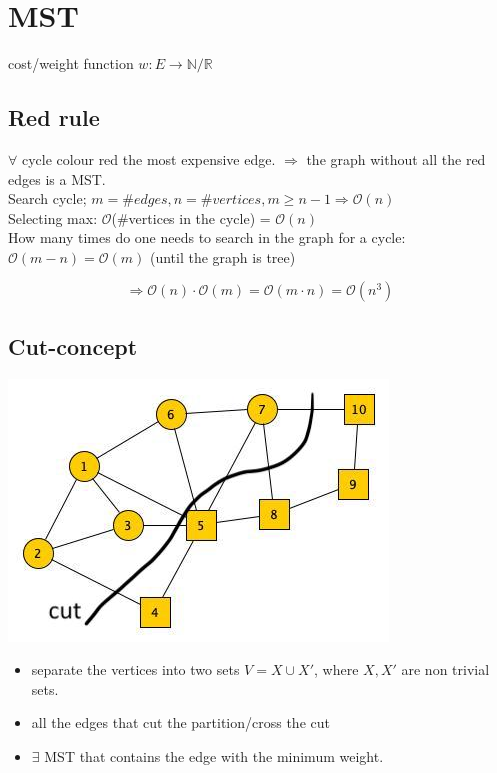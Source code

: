 \section{MST}

cost/weight function
$w: E \rightarrow \mathbb{N}/\mathbb{R}$

\subsection{Red rule}

$\forall$ cycle colour red the most expensive edge. $\Rightarrow$ the graph without all the red edges is a MST.\\

Search cycle; $m = \#edges, n = \#vertices , m \geq n-1 \Rightarrow  \mathcal{O}(n)$ \\

Selecting max: $\mathcal{O}$(\#vertices in the cycle) = $\mathcal{O}(n)$ \\

How many times do one needs to search in the graph for a cycle: \\ $\mathcal{O}(m-n) = \mathcal{O}(m)$ (until the graph is tree)

$$ \Rightarrow \mathcal{O}(n) \cdot \mathcal{O}(m) = \mathcal{O}(m \cdot n) = \mathcal{O}(n^3)$$

\subsection{Cut-concept}
\begin{center}
	\includegraphics[scale=0.5]{img/graph2}
\end{center}

\begin{itemize}
\item separate the vertices into two sets $V = X \cup X'$, where $X,X'$ are non trivial sets.
\item  all the edges that cut the partition/cross the cut
\item  $\exists$ MST that contains the edge with the minimum weight.
\end{itemize}

